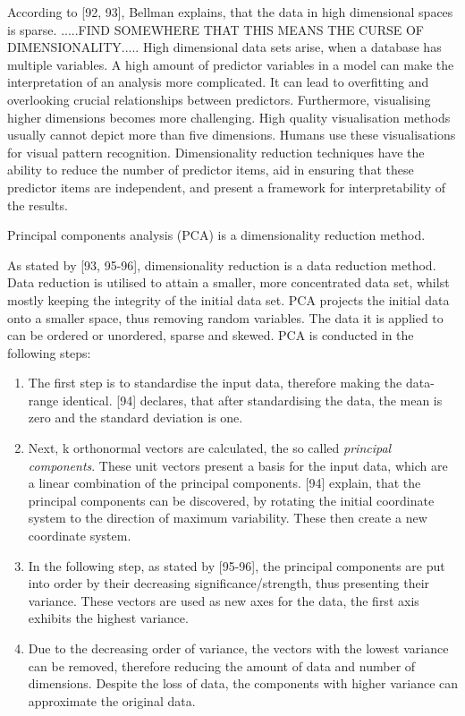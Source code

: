 According to \textcite{DataMiningAndPredictiveAnalytics}[92, 93], Bellman \textcite{bellman2015adaptive} explains, that the data in high dimensional spaces is sparse.
.....FIND SOMEWHERE THAT THIS MEANS THE CURSE OF DIMENSIONALITY.....
High dimensional data sets arise, when a database has multiple  variables. A high amount of predictor variables in a model can make the interpretation of an analysis more complicated. It can lead to overfitting and overlooking crucial relationships between predictors. Furthermore, visualising higher dimensions becomes more challenging. High quality visualisation methods usually cannot depict more than five dimensions. Humans use these visualisations for visual pattern recognition. Dimensionality reduction techniques have the ability to reduce the number of predictor items, aid in ensuring that these predictor items are independent, and present a framework for interpretability of the results.

Principal components analysis (PCA) is a dimensionality reduction method. 



As stated by \textcite{han2011data}[93, 95-96], dimensionality reduction is a data reduction method. Data reduction is utilised to attain a smaller, more concentrated data set, whilst mostly keeping the integrity of the initial data set. PCA projects the initial data onto a smaller space, thus removing random variables. The data it is applied to can be ordered or unordered, sparse and skewed. PCA is conducted in the following steps:
\begin{enumerate}
  \item The first step is to standardise the input data, therefore making the data-range identical. \textcite{DataMiningAndPredictiveAnalytics}[94] declares, that after standardising the data, the mean is zero and the standard deviation is one.
  \item Next, k orthonormal vectors are calculated, the so called \textit{principal components}. These unit vectors present a basis for the input data, which are a linear combination of the principal components. \textcite{DataMiningAndPredictiveAnalytics}[94] explain, that the principal components can be discovered, by rotating the initial coordinate system to the direction of maximum variability. These then create a new coordinate system. 
  \item In the following step, as stated by \textcite{han2011data}[95-96], the principal components are put into order by their decreasing significance/strength, thus presenting their variance. These vectors are used as new axes for the data, the first axis exhibits the highest variance.
  \item Due to the decreasing order  of variance, the vectors with the lowest variance can be removed, therefore reducing the amount of data and number of dimensions. Despite the loss of data, the components with higher variance can approximate the original data.
\end{enumerate}

